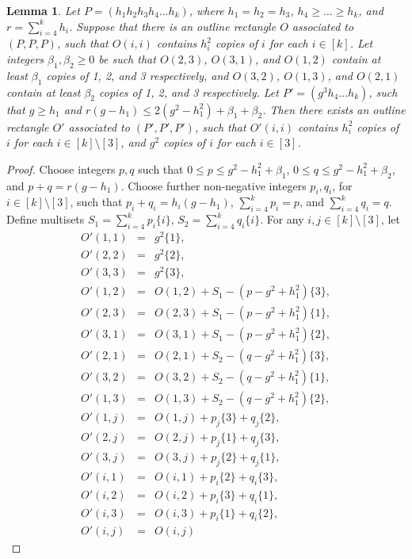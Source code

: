 \documentclass{sn-jnl}
\newtheorem{lemma}[theorem]{Lemma}
\theoremstyle{definition}
\begin{document}
\begin{lemma}
\label{blow_up_3}
Let $P=(h_1h_2h_3h_4\dots h_k)$, where $h_1=h_2=h_3$, $h_4 \ge \dots \ge h_k$, and $r=\sum_{i=4}^k h_i$. Suppose that there is an outline rectangle $O$ associated to $(P,P,P)$, such that $O(i,i)$ contains $h_i^2$ copies of $i$ for each $i\in [k]$. Let integers $\beta_1, \beta_2 \ge 0$ be such that $O(2,3)$, $O(3,1)$, and $O(1,2)$ contain at least $\beta_1$ copies of 1, 2, and 3  respectively, and $O(3,2)$, $O(1,3)$, and $O(2,1)$ contain at least $\beta_2$ copies of 1, 2, and 3 respectively.
Let $P'=(g^3h_4\dots h_k)$, such that $g\ge h_1$ and $r(g-h_1) \le 2(g^2-h_1^2)+\beta_1+\beta_2$. 
Then there exists an outline rectangle $O'$ associated to $(P',P',P')$, such that $O'(i,i)$ contains $h_i^2$ copies of $i$ for each $i\in [k] \setminus [3]$, and $g^2$ copies of $i$ for each $i\in [3]$.
\end{lemma}
\begin{proof}
    Choose integers $p,q$ such that $0\le p \le g^2-h_1^2+\beta_1$, $0\le q \le g^2-h_1^2+\beta_2$, and $p+q = r(g-h_1)$. Choose further non-negative integers $p_i, q_i$, for $i\in [k]\setminus [3]$, such that $p_i+q_i=h_i(g-h_1)$, $\sum_{i=4}^k p_i =p$, and $\sum_{i=4}^k q_i =q$. Define multisets $S_1=\sum_{i=4}^k p_i\{i\}$, $S_2=\sum_{i=4}^k q_i\{i\}$. For any $i,j \in [k]\setminus [3]$, let 
    \begin{eqnarray*}
    O'(1,1) &=& g^2 \{1\}, \\
    O'(2,2) &=& g^2 \{2\}, \\
    O'(3,3) &=& g^2 \{3\}, \\
    O'(1,2) &=& O(1,2) + S_1 - (p-g^2+h_1^2)\{3\}, \\
    O'(2,3) &=& O(2,3) + S_1 - (p-g^2+h_1^2)\{1\}, \\
    O'(3,1) &=& O(3,1) + S_1 - (p-g^2+h_1^2)\{2\}, \\
    O'(2,1) &=& O(2,1) + S_2 - (q-g^2+h_1^2)\{3\}, \\
    O'(3,2) &=& O(3,2) + S_2 - (q-g^2+h_1^2)\{1\}, \\
    O'(1,3) &=& O(1,3) + S_2 - (q-g^2+h_1^2)\{2\}, \\
    O'(1,j) &=& O(1,j) + p_j\{3\} + q_j\{2\}, \\
    O'(2,j) &=& O(2,j) + p_j\{1\} + q_j\{3\}, \\
    O'(3,j) &=& O(3,j) + p_j\{2\} + q_j\{1\}, \\
    O'(i,1) &=& O(i,1) + p_i\{2\} + q_i\{3\}, \\
    O'(i,2) &=& O(i,2) + p_i\{3\} + q_i\{1\}, \\
    O'(i,3) &=& O(i,3) + p_i\{1\} + q_i\{2\}, \\
    O'(i,j) &=& O(i,j)   
\end{eqnarray*}
\end{proof}
\end{document}
